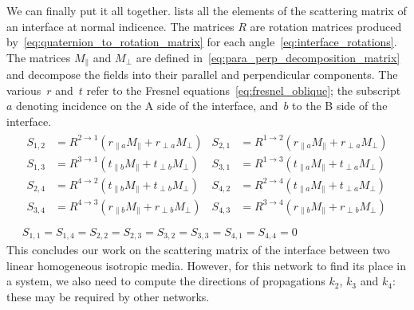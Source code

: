 We can finally put it all together.
 lists all the elements of the scattering matrix of an interface at normal indicence.
The matrices $R$ are rotation matrices produced by~\cref{eq:quaternion_to_rotation_matrix} for each angle~\eqref{eq:interface_rotations}.
The matrices $M_\parallel$ and $M_\perp$ are defined in~\cref{eq:para_perp_decomposition_matrix} and decompose the fields into their parallel and perpendicular components.
The various~$r$ and~$t$ refer to the Fresnel equations~\eqref{eq:fresnel_oblique}; the subscript~$a$ denoting incidence on the A side of the interface, and~$b$ to the B side of the interface.
\begin{equation}
    \begin{gathered}
    \begin{aligned}
        S_{1, 2} &= R^{2 \rightarrow 1} \left(
            r_{\parallel a} M_\parallel +
            r_{\perp a} M_\perp
        \right)
        &
        S_{2, 1} &= R^{1 \rightarrow 2} \left(
            r_{\parallel a} M_\parallel +
            r_{\perp a} M_\perp
        \right)
        \\
        S_{1, 3} &= R^{3 \rightarrow 1} \left(
            t_{\parallel b} M_\parallel +
            t_{\perp b} M_\perp
        \right)
        &
        S_{3, 1} &= R^{1 \rightarrow 3} \left(
            t_{\parallel a} M_\parallel +
            t_{\perp a} M_\perp
        \right)
        \\
        S_{2, 4} &= R^{4 \rightarrow 2} \left(
            t_{\parallel b} M_\parallel +
            t_{\perp b} M_\perp
        \right)
        &
        S_{4, 2} &= R^{2 \rightarrow 4} \left(
            t_{\parallel a} M_\parallel +
            t_{\perp a} M_\perp
        \right)
        \\
        S_{3, 4} &= R^{4 \rightarrow 3} \left(
            r_{\parallel b} M_\parallel +
            r_{\perp b} M_\perp
        \right)
        &
        S_{4, 3} &= R^{3 \rightarrow 4} \left(
            r_{\parallel b} M_\parallel +
            r_{\perp b} M_\perp
        \right)
        \\
    \end{aligned}
    \\
    S_{1, 1} = S_{1, 4} = S_{2, 2} = S_{2, 3} = S_{3, 2} = S_{3, 3} = S_{4, 1} = S_{4, 4} = 0
    \end{gathered}
    \label{eq:interface_S}
\end{equation}
This concludes our work on the scattering matrix of the interface between two linear homogeneous isotropic media.
However, for this network to find its place in a system, we also need to compute the directions of propagations $k_2$, $k_3$ and $k_4$: these may be required by other networks.

